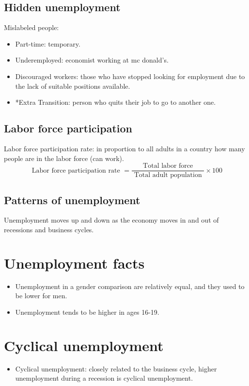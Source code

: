 \documentclass[openany]{book}
\begin{document}
\subsection{Hidden unemployment}
Mislabeled people: 
\begin{itemize}
    \item Part-time: temporary.
    \item Underemployed: economist working at mc donald's.
    \item Discouraged workers: those who have stopped looking for employment due to the lack of suitable positions available.
    \item *Extra Transition: person who quits their job to go to another one. 
\end{itemize}

\subsection{Labor force participation}
Labor force participation rate: in proportion to all adults in a country how many people are in the labor force (can work). 
\[
  \text{ Labor force participation rate } = \frac{\text{ Total labor force }}{\text{ Total adult population }} \times 100
\]

\subsection{Patterns of unemployment}
Unemployment moves up and down as the economy moves in and out of recessions and business cycles.

\section{Unemployment facts}
\begin{itemize}
    \item Unemployment in a gender comparison are relatively equal, and they used to be lower for men. 
    \item Unemployment tends to be higher in ages 16-19.
\end{itemize}


\section{Cyclical unemployment}
\begin{itemize}
    \item Cyclical unemployment: closely related to the business cycle, higher unemployment during a recession is cyclical unemployment. 
\end{itemize}
\end{document}

